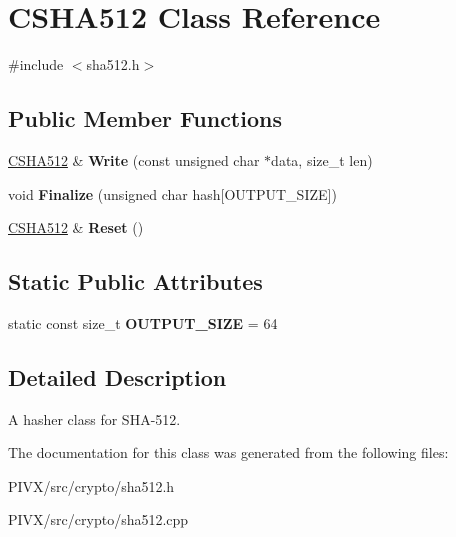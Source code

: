 \hypertarget{class_c_s_h_a512}{}\section{C\+S\+H\+A512 Class Reference}
\label{class_c_s_h_a512}


{\ttfamily \#include $<$sha512.\+h$>$}

\subsection*{Public Member Functions}
\begin{DoxyCompactItemize}
\item 
\mbox{\label{class_c_s_h_a512_aefd8260a2c205f11d44670ae68f1aff0}} 
\mbox{\hyperlink{class_c_s_h_a512}{C\+S\+H\+A512}} \& {\bfseries Write} (const unsigned char $\ast$data, size\+\_\+t len)
\item 
\mbox{\label{class_c_s_h_a512_aef4627aae19eeeb54bf02ea7b222b688}} 
void {\bfseries Finalize} (unsigned char hash\mbox{[}O\+U\+T\+P\+U\+T\+\_\+\+S\+I\+ZE\mbox{]})
\item 
\mbox{\label{class_c_s_h_a512_a6c469e0a6d1988cb255acf15afc66c2e}} 
\mbox{\hyperlink{class_c_s_h_a512}{C\+S\+H\+A512}} \& {\bfseries Reset} ()
\end{DoxyCompactItemize}
\subsection*{Static Public Attributes}
\begin{DoxyCompactItemize}
\item 
\mbox{\label{class_c_s_h_a512_a2de748ad386b21314f9990029d41dd53}} 
static const size\+\_\+t {\bfseries O\+U\+T\+P\+U\+T\+\_\+\+S\+I\+ZE} = 64
\end{DoxyCompactItemize}


\subsection{Detailed Description}
A hasher class for S\+H\+A-\/512. 

The documentation for this class was generated from the following files\+:\begin{DoxyCompactItemize}
\item 
P\+I\+V\+X/src/crypto/sha512.\+h\item 
P\+I\+V\+X/src/crypto/sha512.\+cpp\end{DoxyCompactItemize}
